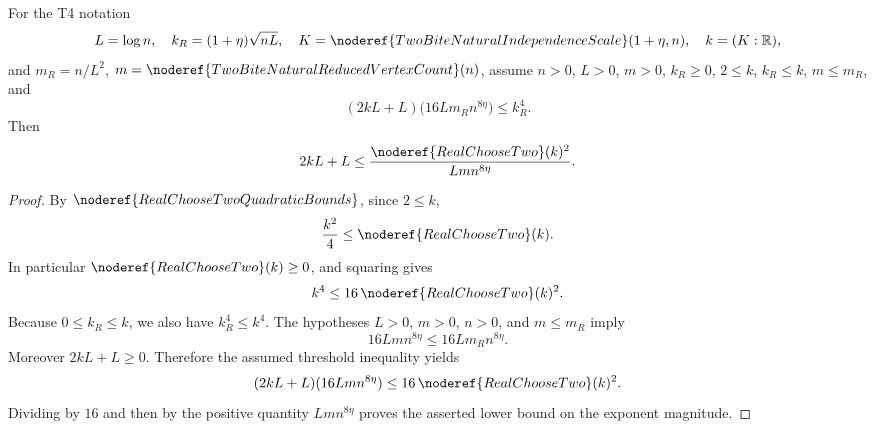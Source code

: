 \begin{helper}
For the T4 notation
\[
L=\log n,\quad k_R=(1+\eta)\sqrt{nL},\quad
K=\noderef{TwoBiteNaturalIndependenceScale}(1+\eta,n),\quad
k=(K:\mathbb R),
\]
and \(m_R=n/L^2\), \(m=\noderef{TwoBiteNaturalReducedVertexCount}(n)\),
assume \(n>0\), \(L>0\), \(m>0\), \(k_R\ge0\), \(2\le k\),
\(k_R\le k\), \(m\le m_R\), and
\[
(2kL+L)\bigl(16Lm_R n^{8\eta}\bigr)\le k_R^4 .
\]
Then
\[
2kL+L\le
\frac{\noderef{RealChooseTwo}(k)^2}{Lm n^{8\eta}}.
\]
\end{helper}
\begin{proof}
By \(\noderef{RealChooseTwoQuadraticBounds}\), since \(2\le k\),
\[
\frac{k^2}{4}\le \noderef{RealChooseTwo}(k).
\]
In particular \(\noderef{RealChooseTwo}(k)\ge0\), and squaring gives
\[
k^4\le16\,\noderef{RealChooseTwo}(k)^2.
\]
Because \(0\le k_R\le k\), we also have \(k_R^4\le k^4\).
The hypotheses \(L>0\), \(m>0\), \(n>0\), and \(m\le m_R\) imply
\[
16Lm n^{8\eta}\le16Lm_R n^{8\eta}.
\]
Moreover \(2kL+L\ge0\).  Therefore the assumed threshold inequality yields
\[
(2kL+L)(16Lm n^{8\eta})
\le16\,\noderef{RealChooseTwo}(k)^2.
\]
Dividing by \(16\) and then by the positive quantity \(Lm n^{8\eta}\)
proves the asserted lower bound on the exponent magnitude.
\end{proof}
